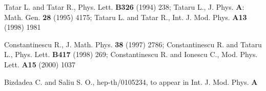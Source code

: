 \documentclass[a4paper,10pt]{article}
\begin{document}
\begin{thebibliography}{99}
  Tatar L. and Tatar R.,
Phys. Lett. {\bf{B326}} (1994) 238;
Tataru L.,
J. Phys. {\bf{A}}: Math. Gen. {\bf{28}} (1995) 4175;
Tataru L. and Tatar R.,
Int. J. Mod. Phys. {\bf{A13}} (1998) 1981

  Constantinescu R.,
J. Math. Phys. {\bf{38}} (1997) 2786;
Constantinescu R. and Tataru L.,
Phys. Lett. {\bf{B417}} (1998) 269;
Constantinescu R. and Ionescu C.,
Mod. Phys. Lett. {\bf{A15}} (2000) 1037

  Bizdadea C. and Saliu S. O.,
hep-th/0105234, to appear in Int. J. Mod. Phys. {\bf{A}}
\end{thebibliography}
\end{document}
